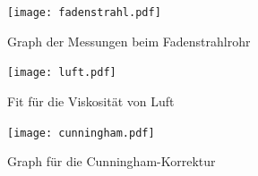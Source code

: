 \documentclass[11pt, ngerman]{article}
\begin{document}
\newcommand\fraction{.4}

\begin{figure}[h!]
	\centering
	\texttt{[image: fadenstrahl.pdf]}
	\caption{Graph der Messungen beim Fadenstrahlrohr}
	\label{fig:graph-fadenstrahlrohr}
\end{figure}

\begin{figure}[h!]
	\centering
	\texttt{[image: luft.pdf]}
	\caption{Fit für die Viskosität von Luft}
	\label{fig:luft.pdf}
\end{figure}

\begin{figure}[h!]
	\centering
	\texttt{[image: cunningham.pdf]}
	\caption{Graph für die Cunningham-Korrektur}
	\label{fig:cunningham}
\end{figure}
\end{document}
